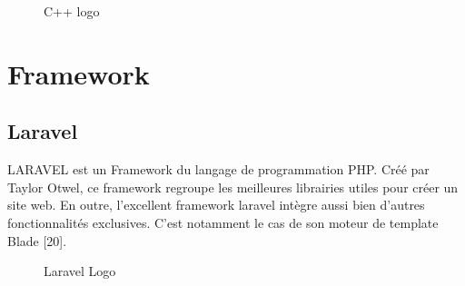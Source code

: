 \begin{figure}[hbt]
\centering
\right
\label{fig:C++ LOGO}

  \caption{C++ logo}
\end{figure}
\newpage
\section{Framework}
\subsection{Laravel}
LARAVEL est un Framework du langage de programmation PHP. Créé par Taylor Otwel, ce framework regroupe les meilleures librairies utiles pour créer un site web. En outre, l’excellent framework laravel intègre aussi bien d’autres fonctionnalités exclusives. C’est notamment le cas de son moteur de template Blade [20].
\begin{figure}[hbt]
\centering
\label{fig:Laravel LOGO}

  \caption{Laravel Logo}
\end{figure}
\newline
\newline
